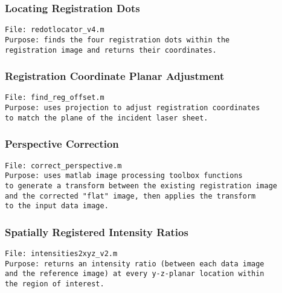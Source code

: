 

\pagebreak
\subsubsection{Locating Registration Dots}
\begin{verbatim} 
File: redotlocator_v4.m
Purpose: finds the four registration dots within the 
registration image and returns their coordinates.
\end{verbatim}



\pagebreak
\subsubsection{Registration Coordinate Planar Adjustment}
\begin{verbatim} 
File: find_reg_offset.m
Purpose: uses projection to adjust registration coordinates 
to match the plane of the incident laser sheet.
\end{verbatim}



\pagebreak
\subsubsection{Perspective Correction}
\begin{verbatim} 
File: correct_perspective.m
Purpose: uses matlab image processing toolbox functions 
to generate a transform between the existing registration image 
and the corrected "flat" image, then applies the transform 
to the input data image.
\end{verbatim}



\pagebreak
\subsubsection{Spatially Registered Intensity Ratios}
\begin{verbatim} 
File: intensities2xyz_v2.m
Purpose: returns an intensity ratio (between each data image 
and the reference image) at every y-z-planar location within 
the region of interest.
\end{verbatim}

